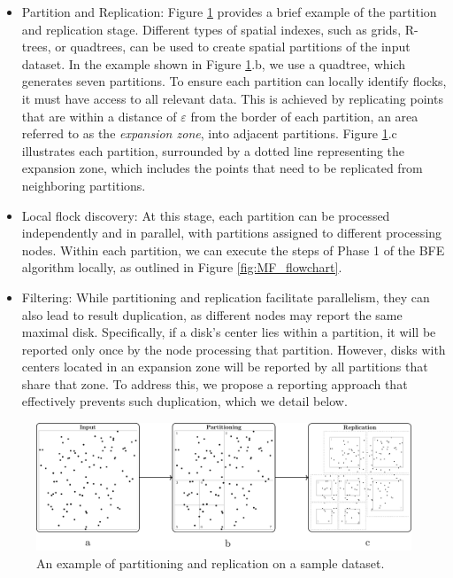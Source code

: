 \begin{itemize}
    \item Partition and Replication: Figure \ref{fig:partrep} provides a brief example of the partition and replication stage. Different types of spatial indexes, such as grids, R-trees, or quadtrees, can be used to create spatial partitions of the input dataset. In the example shown in Figure \ref{fig:partrep}.b, we use a quadtree, which generates seven partitions. To ensure each partition can locally identify flocks, it must have access to all relevant data. This is achieved by replicating points that are within a distance of $\varepsilon$ from the border of each partition, an area referred to as the \textit{expansion zone}, into adjacent partitions. Figure \ref{fig:partrep}.c illustrates each partition, surrounded by a dotted line representing the expansion zone, which includes the points that need to be replicated from neighboring partitions.

    \item Local flock discovery: At this stage, each partition can be processed independently and in parallel, with partitions assigned to different processing nodes. Within each partition, we can execute the steps of Phase 1 of the BFE algorithm locally, as outlined in Figure \ref{fig:MF_flowchart}.

    \item Filtering: While partitioning and replication facilitate parallelism, they can also lead to result duplication, as different nodes may report the same maximal disk. Specifically, if a disk's center lies within a partition, it will be reported only once by the node processing that partition. However, disks with centers located in an expansion zone will be reported by all partitions that share that zone. To address this, we propose a reporting approach that effectively prevents such duplication, which we detail below.
\end{itemize}

\begin{figure}
    \centering
    \includegraphics[width=\linewidth]{chapter4/figures/MF_stages/P123}
    \caption{An example of partitioning and replication on a sample dataset.}\label{fig:partrep}
\end{figure}

